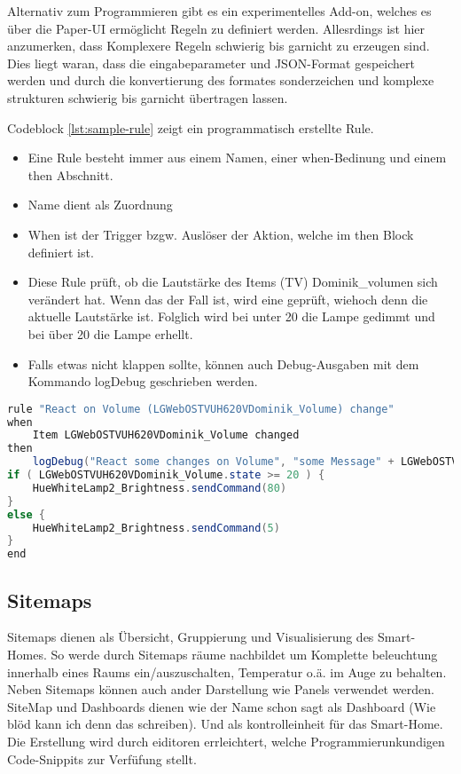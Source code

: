 Alternativ zum Programmieren gibt es ein experimentelles Add-on, welches es über die Paper-UI ermöglicht Regeln zu definiert werden. Allesrdings ist hier anzumerken, dass Komplexere Regeln schwierig bis garnicht zu erzeugen sind. Dies liegt waran, dass die eingabeparameter und JSON-Format gespeichert werden und durch die konvertierung des formates sonderzeichen und komplexe strukturen schwierig bis garnicht übertragen lassen.

Codeblock \ref{lst:sample-rule} zeigt ein programmatisch erstellte Rule.
\begin{itemize}
		\item Eine Rule besteht immer aus einem Namen, einer when-Bedinung und einem then Abschnitt.
		\item Name dient als Zuordnung
		\item When ist der Trigger bzgw. Auslöser der Aktion, welche im then Block definiert ist.
		\item Diese Rule prüft, ob die Lautstärke des Items (TV) Dominik\_volumen sich verändert hat.
		Wenn das der Fall ist, wird eine geprüft, wiehoch denn die aktuelle Lautstärke ist.
		Folglich wird bei unter 20 die Lampe gedimmt und bei über 20 die Lampe erhellt.
		\item Falls etwas nicht klappen sollte, können auch Debug-Ausgaben mit dem Kommando logDebug geschrieben werden.
\end{itemize}

\begin{lstlisting}[language=java,firstnumber=1,caption=Beispiele Rule Beispiel,label=lst:sample-rule]
rule "React on Volume (LGWebOSTVUH620VDominik_Volume) change"
when
	Item LGWebOSTVUH620VDominik_Volume changed
then
	logDebug("React some changes on Volume", "some Message" + LGWebOSTVUH620VDominik_Volume.state.toString)
if ( LGWebOSTVUH620VDominik_Volume.state >= 20 ) {
	HueWhiteLamp2_Brightness.sendCommand(80)
}
else {
	HueWhiteLamp2_Brightness.sendCommand(5)
}
end
\end{lstlisting}

\subsection{Sitemaps}
Sitemaps dienen als Übersicht, Gruppierung und Visualisierung des Smart-Homes. So werde durch Sitemaps räume nachbildet um Komplette beleuchtung innerhalb eines Raums ein/auszuschalten, Temperatur o.ä. im Auge zu behalten. Neben Sitemaps können auch ander Darstellung wie Panels verwendet werden. SiteMap und Dashboards dienen wie der Name schon sagt als Dashboard (Wie blöd kann ich denn das schreiben). Und als kontrolleinheit für das Smart-Home. Die Erstellung wird durch eiditoren errleichtert, welche Programmierunkundigen Code-Snippits zur Verfüfung stellt.

